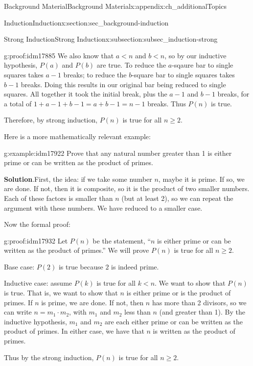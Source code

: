 \documentclass[oneside,10pt,]{book}
\numberwithin{equation}{chapter}
\newcommand{\lt}{<}
\begin{document}
\begin{appendixptx}{Background Material}{}{Background Material}{}{}{x:appendix:ch_additionalTopics}
\begin{sectionptx}{Induction}{}{Induction}{}{}{x:section:sec_background-induction}
\begin{subsectionptx}{Strong Induction}{}{Strong Induction}{}{}{x:subsection:subsec_induction-strong}
\begin{proofptx}{}{g:proof:idm17885}
We also know that \(a \lt n\) and \(b \lt n\), so by our inductive hypothesis, \(P(a)\) and \(P(b)\) are true.  To reduce the \(a\)-sqaure bar to single squares takes \(a-1\) breaks; to reduce the \(b\)-square bar to single squares takes \(b-1\) breaks.  Doing this results in our original bar being reduced to single squares.  All together it took the initial break, plus the \(a-1\) and \(b-1\) breaks, for a total of \(1+a-1+b-1 = a+b-1 = n-1\) breaks.  Thus \(P(n)\) is true.%
\par
Therefore, by strong induction, \(P(n)\) is true for all \(n \ge 2\).%
\end{proofptx}
Here is a more mathematically relevant example:%
\begin{example}{}{g:example:idm17922}%
Prove that any natural number greater than 1 is either prime or can be written as the product of primes.%
\par\smallskip%
\noindent\textbf{Solution}.\hypertarget{g:solution:idm17927}{}\quad{}First, the idea: if we take some number \(n\), maybe it is prime. If so, we are done. If not, then it is composite, so it is the product of two smaller numbers. Each of these factors is smaller than \(n\) (but at least 2), so we can repeat the argument with these numbers. We have reduced to a smaller case.%
\par
Now the formal proof:%
\begin{proofptx}{}{g:proof:idm17932}
Let \(P(n)\) be the statement, ``\(n\) is either prime or can be written as the product of primes.'' We will prove \(P(n)\) is true for all \(n \ge 2\).%
\par
Base case: \(P(2)\) is true because \(2\) is indeed prime.%
\par
Inductive case: assume \(P(k)\) is true for all \(k \lt  n\). We want to show that \(P(n)\) is true. That is, we want to show that \(n\) is either prime or is the product of primes. If \(n\) is prime, we are done. If not, then \(n\) has more than 2 divisors, so we can write \(n = m_1 \cdot m_2\), with \(m_1\) and \(m_2\) less than \(n\) (and greater than 1). By the inductive hypothesis, \(m_1\) and \(m_2\) are each either prime or can be written as the product of primes. In either case, we have that \(n\) is written as the product of primes.%
\par
Thus by the strong induction, \(P(n)\) is true for all \(n \ge 2\).%
\end{proofptx}
\end{example}

\end{subsectionptx}
\end{sectionptx}
\end{appendixptx}
\end{document}
